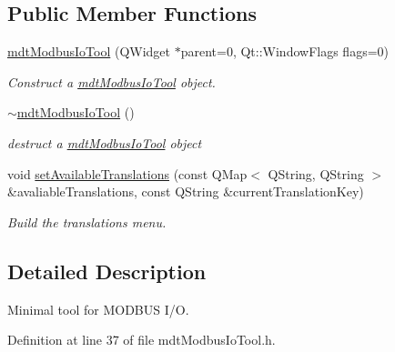 \subsection*{Public Member Functions}
\begin{DoxyCompactItemize}
\item 
\hypertarget{classmdt_modbus_io_tool_a8ce66aaa36a5e1f5569eaf00f01f28c6}{
\hyperlink{classmdt_modbus_io_tool_a8ce66aaa36a5e1f5569eaf00f01f28c6}{mdtModbusIoTool} (QWidget $\ast$parent=0, Qt::WindowFlags flags=0)}
\label{classmdt_modbus_io_tool_a8ce66aaa36a5e1f5569eaf00f01f28c6}

\begin{DoxyCompactList}\small\item\em Construct a \hyperlink{classmdt_modbus_io_tool}{mdtModbusIoTool} object. \end{DoxyCompactList}\item 
\hypertarget{classmdt_modbus_io_tool_a4321c2d67a52e135dba99a053ef26547}{
\hyperlink{classmdt_modbus_io_tool_a4321c2d67a52e135dba99a053ef26547}{$\sim$mdtModbusIoTool} ()}
\label{classmdt_modbus_io_tool_a4321c2d67a52e135dba99a053ef26547}

\begin{DoxyCompactList}\small\item\em destruct a \hyperlink{classmdt_modbus_io_tool}{mdtModbusIoTool} object \end{DoxyCompactList}\item 
\hypertarget{classmdt_modbus_io_tool_a5609881a00e48c8cbd0047c3c6a15ff5}{
void \hyperlink{classmdt_modbus_io_tool_a5609881a00e48c8cbd0047c3c6a15ff5}{setAvailableTranslations} (const QMap$<$ QString, QString $>$ \&avaliableTranslations, const QString \&currentTranslationKey)}
\label{classmdt_modbus_io_tool_a5609881a00e48c8cbd0047c3c6a15ff5}

\begin{DoxyCompactList}\small\item\em Build the translations menu. \end{DoxyCompactList}\end{DoxyCompactItemize}


\subsection{Detailed Description}
Minimal tool for MODBUS I/O. 

Definition at line 37 of file mdtModbusIoTool.h.



